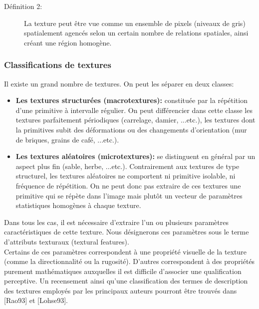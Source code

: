 \begin{description}
	\item[Définition 2:] 	
	La texture peut être vue comme un ensemble de pixels (niveaux de gris) spatialement agencés selon un certain nombre de relations spatiales, ainsi créant une région homogène.
\end{description}

\subsubsection{Classifications de textures}
Il existe un grand nombre de textures. On peut les séparer en deux classes:
\begin{itemize}
	\item \textbf{Les textures structurées (macrotextures):} constituée par la répétition d’une primitive à intervalle régulier. On peut différencier dans cette classe les textures parfaitement périodiques (carrelage, damier, ...etc.), les textures dont la primitives subit des déformations ou des changements d'orientation (mur de briques, grains de café, ...etc.).
	
	\item \textbf{Les textures aléatoires (microtextures):} se distinguent en général par un aspect plus fin (sable, herbe, ...etc.). Contrairement aux textures de type structurel, les textures aléatoires ne comportent ni primitive isolable, ni fréquence de répétition. On ne peut donc pas extraire de ces textures une primitive qui se répète dans l’image mais plutôt un vecteur de paramètres statistiques homogènes à chaque texture.
\end{itemize}

Dans tous les cas, il est nécessaire d'extraire l'un ou plusieurs paramètres caractéristiques de cette texture. Nous désignerons ces paramètres sous le terme d’attributs texturaux (textural features).\\

Certains de ces paramètres correspondent à une propriété visuelle de la texture (comme la directionnalité ou la rugosité). D'autres correspondent à des propriétés purement mathématiques auxquelles il est difficile d'associer une qualification perceptive.
Un recensement ainsi qu'une classification des termes de description des textures employés par les principaux auteurs pourront être trouvés dans [Rao93] et [Lohse93].\\

